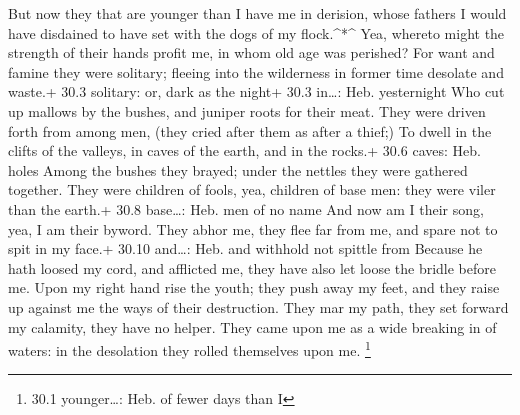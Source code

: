  But now they that are younger than I have me in derision,
whose fathers I would have disdained to have set with the dogs of my
flock.\^{}*\^{}  Yea, whereto might the strength of their
hands profit me, in whom old age was perished?  For want and
famine they were solitary; fleeing into the wilderness in former time
desolate and waste.+ 30.3 solitary: or, dark as the night+ 30.3
in\ldots: Heb. yesternight  Who cut up mallows by the
bushes, and juniper roots for their meat.  They were driven
forth from among men, (they cried after them as after a thief;)
 To dwell in the clifts of the valleys, in caves of the
earth, and in the rocks.+ 30.6 caves: Heb. holes  Among the
bushes they brayed; under the nettles they were gathered together.
 They were children of fools, yea, children of base men:
they were viler than the earth.+ 30.8 base\ldots: Heb. men of no name
 And now am I their song, yea, I am their byword.
 They abhor me, they flee far from me, and spare not to
spit in my face.+ 30.10 and\ldots: Heb. and withhold not spittle from
 Because he hath loosed my cord, and afflicted me, they
have also let loose the bridle before me.  Upon my right
hand rise the youth; they push away my feet, and they raise up against
me the ways of their destruction.  They mar my path, they
set forward my calamity, they have no helper.  They came
upon me as a wide breaking in of waters: in the desolation they rolled
themselves upon me. \footnote{30.1 younger\ldots: Heb. of fewer days
  than I}

